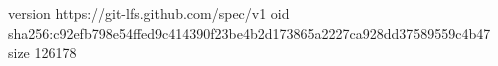 version https://git-lfs.github.com/spec/v1
oid sha256:c92efb798e54ffed9c414390f23be4b2d173865a2227ca928dd37589559c4b47
size 126178
